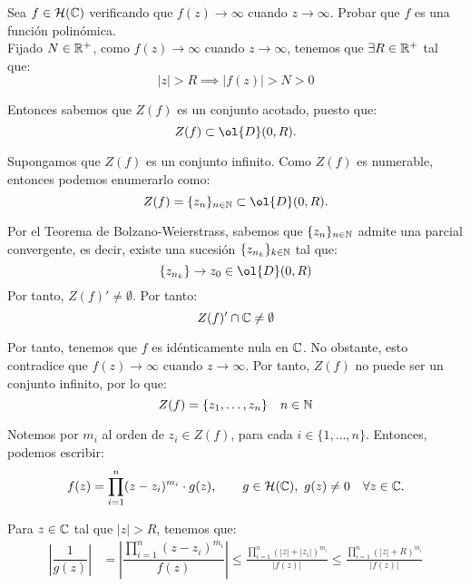 \begin{ejercicio}
    Sea $f\in \mathcal{H}(\mathbb{C})$ verificando que $f(z)\to \infty$ cuando $z\to \infty$. Probar que $f$ es una función polinómica.\\

    Fijado $N\in \mathbb{R}^+$, como $f(z)\to \infty$ cuando $z\to \infty$, tenemos que $\exists R\in \mathbb{R}^+$ tal que:
    \begin{equation*}
        |z|>R \implies |f(z)|>N>0
    \end{equation*}

    Entonces sabemos que $Z(f)$ es un conjunto acotado, puesto que:
    \begin{equation*}
        Z(f)\subset \ol{D}(0,R).
    \end{equation*}

    Supongamos que $Z(f)$ es un conjunto infinito. Como $Z(f)$ es numerable, entonces podemos enumerarlo como:
    \begin{equation*}
        Z(f)=\{z_n\}_{n\in \bb{N}}\subset \ol{D}(0,R).
    \end{equation*}

    Por el Teorema de Bolzano-Weierstrass, sabemos que $\{z_n\}_{n\in \mathbb{N}}$ admite una parcial convergente, es decir, existe una sucesión $\{z_{n_k}\}_{k\in \mathbb{N}}$ tal que:
    \begin{equation*}
        \left\{z_{n_k}\right\}\to z_0\in \ol{D}(0,R)
    \end{equation*}
    Por tanto, $Z(f)'\neq \emptyset$. Por tanto:
    \begin{equation*}
        Z(f)'\cap \mathbb{C}\neq \emptyset
    \end{equation*}

    Por tanto, tenemos que $f$ es idénticamente nula en $\mathbb{C}$. No obstante, esto contradice que $f(z)\to \infty$ cuando $z\to \infty$. Por tanto, $Z(f)$ no puede ser un conjunto infinito, por lo que:
    \begin{equation*}
        Z(f)=\{z_1,\ldots,z_n\} \quad n\in \mathbb{N}
    \end{equation*}

    Notemos por $m_i$ al orden de $z_i\in Z(f)$, para cada $i\in \{1,\ldots,n\}$. Entonces, podemos escribir:
    \begin{equation*}
        f(z) = \prod_{i=1}^{n} (z-z_i)^{m_i}\cdot g(z),\qquad g\in \cc{H}(\bb{C}),\ g(z)\neq 0 \quad \forall z\in \bb{C}.
    \end{equation*}

    Para $z\in \mathbb{C}$ tal que $|z|>R$, tenemos que:
    \begin{align*}
        \left|\dfrac{1}{g(z)}\right| &= \left|\dfrac{\prod\limits_{i=1}^{n} (z-z_i)^{m_i}}{f(z)}\right|
        \leq \frac{\prod\limits_{i=1}^{n} \left(|z|+|z_i|\right)^{m_i}}{|f(z)|}
        \leq \frac{\prod\limits_{i=1}^{n} \left(|z|+R\right)^{m_i}}{|f(z)|}
    \end{align*}


\end{ejercicio}
